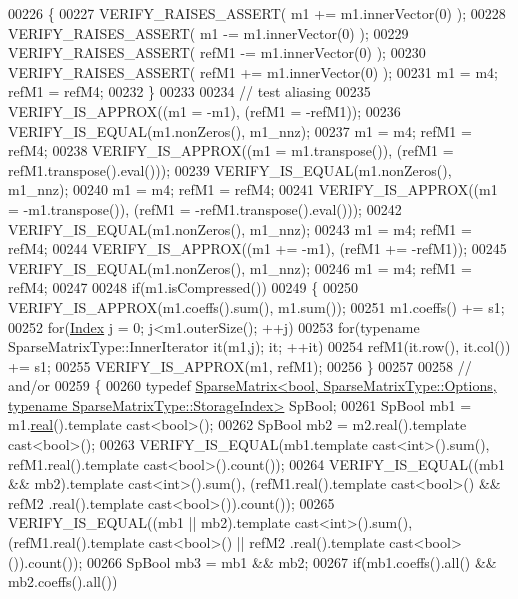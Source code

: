 \begin{DoxyCode}
00226     \{
00227       VERIFY\_RAISES\_ASSERT( m1 += m1.innerVector(0) );
00228       VERIFY\_RAISES\_ASSERT( m1 -= m1.innerVector(0) );
00229       VERIFY\_RAISES\_ASSERT( refM1 -= m1.innerVector(0) );
00230       VERIFY\_RAISES\_ASSERT( refM1 += m1.innerVector(0) );
00231       m1 = m4; refM1 = refM4;
00232     \}
00233 
00234     \textcolor{comment}{// test aliasing}
00235     VERIFY\_IS\_APPROX((m1 = -m1), (refM1 = -refM1));
00236     VERIFY\_IS\_EQUAL(m1.nonZeros(), m1\_nnz);
00237     m1 = m4; refM1 = refM4;
00238     VERIFY\_IS\_APPROX((m1 = m1.transpose()), (refM1 = refM1.transpose().eval()));
00239     VERIFY\_IS\_EQUAL(m1.nonZeros(), m1\_nnz);
00240     m1 = m4; refM1 = refM4;
00241     VERIFY\_IS\_APPROX((m1 = -m1.transpose()), (refM1 = -refM1.transpose().eval()));
00242     VERIFY\_IS\_EQUAL(m1.nonZeros(), m1\_nnz);
00243     m1 = m4; refM1 = refM4;
00244     VERIFY\_IS\_APPROX((m1 += -m1), (refM1 += -refM1));
00245     VERIFY\_IS\_EQUAL(m1.nonZeros(), m1\_nnz);
00246     m1 = m4; refM1 = refM4;
00247 
00248     \textcolor{keywordflow}{if}(m1.isCompressed())
00249     \{
00250       VERIFY\_IS\_APPROX(m1.coeffs().sum(), m1.sum());
00251       m1.coeffs() += s1;
00252       \textcolor{keywordflow}{for}(\hyperlink{namespace_eigen_a62e77e0933482dafde8fe197d9a2cfde}{Index} j = 0; j<m1.outerSize(); ++j)
00253         \textcolor{keywordflow}{for}(\textcolor{keyword}{typename} SparseMatrixType::InnerIterator it(m1,j); it; ++it)
00254           refM1(it.row(), it.col()) += s1;
00255       VERIFY\_IS\_APPROX(m1, refM1);
00256     \}
00257 
00258     \textcolor{comment}{// and/or}
00259     \{
00260       \textcolor{keyword}{typedef} 
      \hyperlink{group___sparse_core___module_class_eigen_1_1_sparse_matrix}{SparseMatrix<bool, SparseMatrixType::Options, typename SparseMatrixType::StorageIndex>}
       SpBool;
00261       SpBool mb1 = m1.\hyperlink{group___sparse_core___module_a8a21aa3017e094f1c07be866d47d7539}{real}().template cast<bool>();
00262       SpBool mb2 = m2.real().template cast<bool>();
00263       VERIFY\_IS\_EQUAL(mb1.template cast<int>().sum(), refM1.real().template cast<bool>().count());
00264       VERIFY\_IS\_EQUAL((mb1 && mb2).\textcolor{keyword}{template} cast<int>().sum(), (refM1.real().template cast<bool>() && refM2
      .real().template cast<bool>()).count());
00265       VERIFY\_IS\_EQUAL((mb1 || mb2).\textcolor{keyword}{template} cast<int>().sum(), (refM1.real().template cast<bool>() || refM2
      .real().template cast<bool>()).count());
00266       SpBool mb3 = mb1 && mb2;
00267       \textcolor{keywordflow}{if}(mb1.coeffs().all() && mb2.coeffs().all())

\end{DoxyCode}
